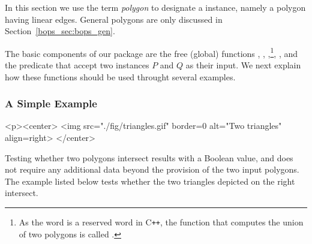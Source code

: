 In this section we use the term {\em polygon} to designate a 
instance, namely a polygon having linear edges. General polygons are only
discussed in Section~\ref{bops_sec:bops_gen}.

The basic components of our package are the free (global) functions
,
, ,\footnote{As the word  is
a reserved word in {C}{\tt ++}, the function that computes the union of
two polygons is called .}, ,
 and the predicate  that
accept two  instances $P$ and $Q$ as their input. We next
explain how these functions should be used throught several examples.

\subsubsection*{A Simple Example}

\lcTex{%
  \vspace{-20pt}
  \setlength{\widthRight}{1.4cm}
  \setlength{\widthLeft}{\widthLineReal}
  \addtolength{\widthLeft}{-\widthRight}
  \begin{minipage}{\widthLeft}
}
\label{fig:example}
\begin{ccHtmlOnly}
  <p><center>
    <img src="./fig/triangles.gif" border=0 alt="Two triangles" align=right>
  </center>
\end{ccHtmlOnly}
Testing whether two polygons intersect results with a Boolean value, 
and does not require any additional data beyond the provision of the 
two input polygons. The example listed below tests whether the two
triangles depicted on the right intersect.

